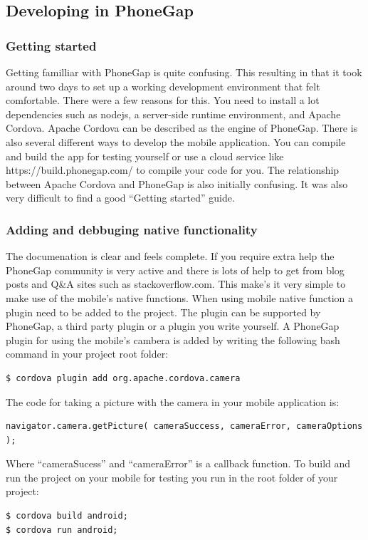 \documentclass{./tex/cslthse-msc}
\begin{document}
\subsection{Developing in PhoneGap}
\subsubsection{Getting started}
Getting familliar with PhoneGap is quite confusing. This resulting in that it took around two days to set up a working development environment that felt comfortable. There were a few reasons for this. You need to install a lot dependencies such as nodejs, a server-side runtime environment, and Apache Cordova. Apache Cordova can be described as the engine of PhoneGap. There is also several different ways to develop the mobile application. You can compile and build the app for testing yourself or use a cloud service like https://build.phonegap.com/ to compile your code for you. The relationship between Apache Cordova and PhoneGap is also initially confusing. It was also very difficult to find a good “Getting started” guide.

\subsubsection{Adding and debbuging native functionality}
The documenation is clear and feels complete. If you require extra help the PhoneGap community is very active and there is lots of help to get from blog posts and Q\&A sites such as stackoverflow.com. This make’s it very simple to make use of the mobile’s native functions. 
\newline
\newline
When using mobile native function a plugin need to be added to the project. The plugin can be supported by PhoneGap, a third party plugin or a plugin you write yourself. A PhoneGap plugin for using the mobile’s cambera is added by writing the following bash command in your project root folder:
\begin{verbatim}
$ cordova plugin add org.apache.cordova.camera
\end{verbatim}
The code for taking a picture with the camera in your mobile application is:
\begin{verbatim}
navigator.camera.getPicture( cameraSuccess, cameraError, cameraOptions );
\end{verbatim}
Where “cameraSucess” and “cameraError” is a callback function. 
\newline
\newline
To build and run the project on your mobile for testing you run in the root folder of your project:
\begin{verbatim}
$ cordova build android; 
$ cordova run android;
\end{verbatim}
\end{document}
